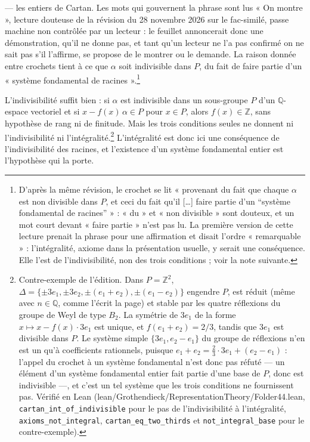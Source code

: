 \documentclass[11pt,a4paper]{article}
\begin{document}
--- les entiers de Cartan. Les mots qui gouvernent la phrase sont lus « On
montre », lecture douteuse de la révision du 28 novembre 2026 sur le
fac-similé, passe machine non contrôlée par un lecteur : le feuillet
annoncerait donc une démonstration, qu'il ne donne pas, et tant qu'un lecteur
ne l'a pas confirmé on ne sait pas s'il l'affirme, se propose de le montrer ou
le demande. La raison donnée entre crochets tient à ce que $\alpha$ soit
indivisible dans $P$, du fait de faire partie d'un « système
fondamental de racines ».\footnote{D'après la même révision, le crochet se lit
« provenant du fait que chaque $\alpha$ est non divisible dans $P$, et ceci du
fait qu'il […] faire partie d'un “système fondamental de racines” » : « du »
et « non divisible » sont douteux, et un mot court devant « faire partie »
n'est pas lu. La première
version de cette lecture prenait la phrase pour une affirmation et disait
l'ordre « remarquable » : l'intégralité, axiome dans la présentation usuelle,
y serait une conséquence. Elle l'est de l'indivisibilité, non des trois
conditions ; voir la note suivante.}

L'indivisibilité suffit bien : si $\alpha$ est indivisible dans un sous-groupe
$P$ d'un $\mathbb{Q}$-espace vectoriel et si $x - f(x)\,\alpha \in P$ pour
$x \in P$, alors $f(x) \in \mathbb{Z}$, sans hypothèse de rang ni de
finitude. Mais les trois conditions seules ne donnent ni l'indivisibilité ni
l'intégralité.\footnote{Contre-exemple de l'édition. Dans $P = \mathbb{Z}^{2}$,
$\Delta = \{\pm 3e_{1}, \pm 3e_{2}, \pm(e_{1}+e_{2}), \pm(e_{1}-e_{2})\}$
engendre $P$, est réduit (même avec $n \in \mathbb{Q}$, comme l'écrit la page)
et stable par les quatre réflexions du groupe de Weyl de type $B_{2}$. La
symétrie de $3e_{1}$ de la forme $x \mapsto x - f(x)\cdot 3e_{1}$ est unique,
et $f(e_{1}+e_{2}) = 2/3$, tandis que $3e_{1}$ est divisible dans $P$. Le
système simple $\{3e_{1}, e_{2}-e_{1}\}$ du groupe de réflexions n'en est un
qu'à coefficients rationnels, puisque $e_{1}+e_{2} = \tfrac{2}{3}\cdot 3e_{1} +
(e_{2}-e_{1})$ : l'appel du crochet à un système fondamental n'est donc pas
réfuté --- un élément d'un système fondamental entier fait partie d'une base
de $P$, donc est indivisible ---, et c'est un tel système que les trois
conditions ne fournissent pas. Vérifié en Lean
(lean/Grothendieck/RepresentationTheory/Folder44.lean, \texttt{cartan\_int\_of\_indivisible} pour le
pas de l'indivisibilité à l'intégralité, \texttt{axioms\_not\_integral},
\texttt{cartan\_eq\_two\_thirds} et \texttt{not\_integral\_base} pour le
contre-exemple).} L'intégralité est donc ici une conséquence de
l'indivisibilité des racines, et l'existence d'un système fondamental entier
est l'hypothèse qui la porte.
\end{document}
